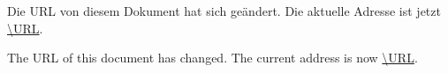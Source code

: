 \documentclass[12pt,a4paper,american,ngerman,numbers=noenddot,toc=listof]{scrartcl}
\begin{document}
Die URL von diesem Dokument hat sich geändert.
Die aktuelle Adresse ist jetzt \url{\URL}.

The URL of this document has changed.
The current address is now \url{\URL}.
\end{document}
